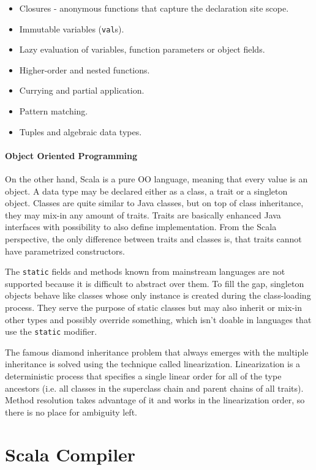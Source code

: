 \documentclass[12pt,a4paper]{report}
\begin{document}
\begin{itemize}
\item Closures - anonymous functions that capture the declaration site scope.
\item Immutable variables (\texttt{val}s).
\item Lazy evaluation of variables, function parameters or object fields.
\item Higher-order and nested functions.
\item Currying and partial application.
\item Pattern matching.
\item Tuples and algebraic data types.
\end{itemize}

\paragraph{Object Oriented Programming} On the other hand, Scala is a pure OO language, meaning that every value is an object. A data type may be declared either as a class, a trait or a singleton object. Classes are quite similar to Java classes, but on top of class inheritance, they may mix-in any amount of traits. Traits are basically enhanced Java interfaces with possibility to also define implementation. From the Scala perspective, the only difference between traits and classes is, that traits cannot have parametrized constructors.

The \texttt{static} fields and methods known from mainstream languages are not supported because it is difficult to abstract over them. To fill the gap, singleton objects behave like classes whose only instance is created during the class-loading process. They serve the purpose of static classes but may also inherit or mix-in other types and possibly override something, which isn't doable in languages that use the \texttt{static} modifier.

The famous diamond inheritance problem that always emerges with the multiple inheritance is solved using the technique called linearization\cite{Linearization}. Linearization is a deterministic process that specifies a single linear order for all of the type ancestors (i.e. all classes in the superclass chain and parent chains of all traits). Method resolution takes advantage of it and works in the linearization order, so there is no place for ambiguity left.

\section{Scala Compiler}
\label{sec:ScalaCompiler}
\end{document}
